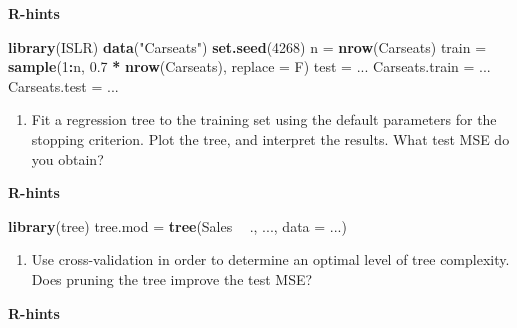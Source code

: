 \documentclass[]{article}
\newenvironment{Shaded}{\begin{snugshade}}{\end{snugshade}}
\newcommand{\DataTypeTok}[1]{\textcolor[rgb]{0.13,0.29,0.53}{#1}}
\newcommand{\DecValTok}[1]{\textcolor[rgb]{0.00,0.00,0.81}{#1}}
\newcommand{\FloatTok}[1]{\textcolor[rgb]{0.00,0.00,0.81}{#1}}
\newcommand{\KeywordTok}[1]{\textcolor[rgb]{0.13,0.29,0.53}{\textbf{#1}}}
\newcommand{\NormalTok}[1]{#1}
\newcommand{\OperatorTok}[1]{\textcolor[rgb]{0.81,0.36,0.00}{\textbf{#1}}}
\newcommand{\StringTok}[1]{\textcolor[rgb]{0.31,0.60,0.02}{#1}}
\providecommand{\tightlist}{%
  \setlength{\itemsep}{0pt}\setlength{\parskip}{0pt}}
\begin{document}
\textbf{R-hints}

\begin{Shaded}
\begin{Highlighting}[]
\KeywordTok{library}\NormalTok{(ISLR)}
\KeywordTok{data}\NormalTok{(}\StringTok{"Carseats"}\NormalTok{)}
\KeywordTok{set.seed}\NormalTok{(}\DecValTok{4268}\NormalTok{)}
\NormalTok{n =}\StringTok{ }\KeywordTok{nrow}\NormalTok{(Carseats)}
\NormalTok{train =}\StringTok{ }\KeywordTok{sample}\NormalTok{(}\DecValTok{1}\OperatorTok{:}\NormalTok{n, }\FloatTok{0.7} \OperatorTok{*}\StringTok{ }\KeywordTok{nrow}\NormalTok{(Carseats), }\DataTypeTok{replace =}\NormalTok{ F)}
\NormalTok{test =}\StringTok{ }\NormalTok{...}
\NormalTok{Carseats.train =}\StringTok{ }\NormalTok{...}
\NormalTok{Carseats.test =}\StringTok{ }\NormalTok{...}
\end{Highlighting}
\end{Shaded}

\begin{enumerate}
\def\labelenumi{\alph{enumi})}
\setcounter{enumi}{1}
\tightlist
\item
  Fit a regression tree to the training set using the default parameters
  for the stopping criterion. Plot the tree, and interpret the results.
  What test MSE do you obtain?
\end{enumerate}

\textbf{R-hints}

\begin{Shaded}
\begin{Highlighting}[]
\KeywordTok{library}\NormalTok{(tree)}
\NormalTok{tree.mod =}\StringTok{ }\KeywordTok{tree}\NormalTok{(Sales }\OperatorTok{~}\StringTok{ }\NormalTok{., ..., }\DataTypeTok{data =}\NormalTok{ ...)}
\end{Highlighting}
\end{Shaded}

\begin{enumerate}
\def\labelenumi{\alph{enumi})}
\setcounter{enumi}{2}
\tightlist
\item
  Use cross-validation in order to determine an optimal level of tree
  complexity. Does pruning the tree improve the test MSE?
\end{enumerate}

\textbf{R-hints}

\begin{Shaded}
\end{Shaded}
\end{document}
